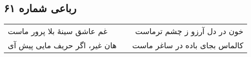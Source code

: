 \begin{center}
\section*{رباعی شماره ۶۱}
\label{sec:sh061}
\begin{longtable}{l p{0.5cm} r}
غم عاشق سینهٔ بلا پرور ماست
&&
خون در دل آرزو ز چشم ترماست
\\
هان غیر، اگر حریف مایی پیش آی
&&
کالماس بجای باده در ساغر ماست
\\
\end{longtable}
\end{center}
